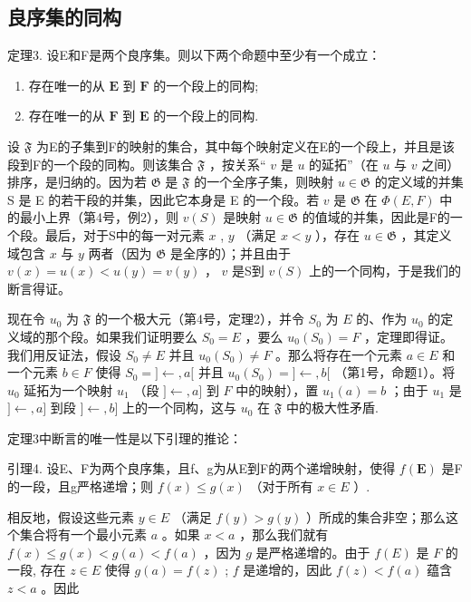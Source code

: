 \subsection{良序集的同构}

定理3. 设E和F是两个良序集。则以下两个命题中至少有一个成立：

\begin{enumerate}
\def\labelenumi{(\arabic{enumi})}
\item
  存在唯一的从 \(\mathbf{E}\) 到 \(\mathbf{F}\) 的一个段上的同构;
\item
  存在唯一的从 \(\mathbf{F}\) 到 \(\mathbf{E}\) 的一个段上的同构.
\end{enumerate}

设 \(\mathfrak{F}\) 为E的子集到F的映射的集合，其中每个映射定义在E的一个段上，并且是该段到F的一个段的同构。则该集合 \(\mathfrak{F}\) ，按关系“ \(v\) 是 \(u\) 的延拓”（在 \(u\) 与 \(v\) 之间）排序，是归纳的。因为若 \(\mathfrak{G}\) 是 \(\mathfrak{F}\) 的一个全序子集，则映射 \(u \in \mathfrak{G}\) 的定义域的并集 S 是 E 的若干段的并集，因此它本身是 E 的一个段。若 \(v\) 是 \(\mathfrak{G}\) 在 \(\Phi(E, F)\) 中的最小上界（第4号，例2），则 \(v(S)\) 是映射 \(u \in \mathfrak{G}\) 的值域的并集，因此是F的一个段。最后，对于S中的每一对元素 \(x\) , \(y\) （满足 \(x < y\) ），存在 \(u \in \mathfrak{G}\) ，其定义域包含 \(x\) 与 \(y\) 两者（因为 \(\mathfrak{G}\) 是全序的）；并且由于 \(v(x) = u(x) < u(y) = v(y)\) ， \(v\) 是S到 \(v(S)\) 上的一个同构，于是我们的断言得证。

现在令 \(u_0\) 为 \(\mathfrak{F}\) 的一个极大元（第4号，定理2），并令 \(S_0\) 为 \(E\) 的、作为 \(u_0\) 的定义域的那个段。如果我们证明要么 \(S_0 = E\) ，要么 \(u_0(S_0) = F\) ，定理即得证。我们用反证法，假设 \(S_0 \neq E\) 并且 \(u_0(S_0) \neq F\) 。那么将存在一个元素 \(a \in E\) 和一个元素 \(b \in F\) 使得 \(S_0 = ]\leftarrow, a[\) 并且 \(u_0(S_0) = ]\leftarrow, b[\) （第1号，命题1）。将 \(u_0\) 延拓为一个映射 \(u_1\) （段 \(]\leftarrow, a]\) 到 \(F\) 中的映射），置 \(u_1(a) = b\) ；由于 \(u_1\) 是 \(]\leftarrow, a]\) 到段 \(]\leftarrow, b]\) 上的一个同构，这与 \(u_0\) 在 \(\mathfrak{F}\) 中的极大性矛盾.

定理3中断言的唯一性是以下引理的推论：

引理4. 设E、F为两个良序集，且f、g为从E到F的两个递增映射，使得 \(f(\mathbf{E})\) 是F的一段，且g严格递增；则 \(f(x) \leqslant g(x)\) （对于所有 \(x \in E\) ）.

相反地，假设这些元素 \(y \in E\) （满足 \(f(y) > g(y)\) ）所成的集合非空；那么这个集合将有一个最小元素 \(a\) 。如果 \(x < a\) ，那么我们就有 \(f(x) \leqslant g(x) < g(a) < f(a)\) ，因为 \(g\) 是严格递增的。由于 \(f(E)\) 是 \(F\) 的一段, 存在 \(z \in E\) 使得 \(g(a) = f(z)\) ; \(f\) 是递增的，因此 \(f(z) < f(a)\) 蕴含 \(z < a\) 。因此

